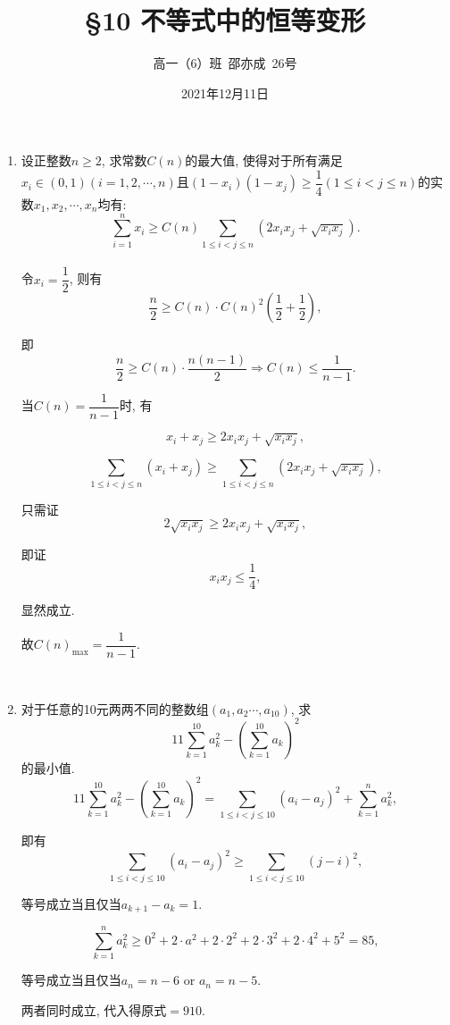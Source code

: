 \documentclass[8pt]{article}
\title{\S 10 不等式中的恒等变形}
\author{高一（6）班\ 邵亦成\ 26号}
\date{2021年12月11日}
\begin{document}
	\maketitle

	\begin{enumerate}
		\item 设正整数$n \geq 2$, 求常数$C(n)$的最大值, 使得对于所有满足$x_i \in (0, 1) (i = 1, 2, \cdots, n)$且$(1-x_i)(1-x_j) \geq \dfrac{1}{4} (1\leq i<j \leq n)$的实数$x_1, x_2, \cdots, x_n$均有: $$\sum_{i=1}^{n} x_i \geq C(n) \sum_{1\leq i<j\leq n} \left(2 x_i x_j + \sqrt{x_i x_j}\right).$$
			~\\

			令$x_i = \dfrac{1}{2}$, 则有$$\frac{n}{2} \geq C(n) \cdot C(n)^2 \left(\frac{1}{2} + \frac{1}{2}\right),$$

			即$$\frac{n}{2} \geq C(n) \cdot \frac{n(n-1)}{2} \Rightarrow C(n) \leq \frac{1}{n-1}.$$

			当$C(n)=\dfrac{1}{n-1}$时, 有

			$$x_i + x_j \geq 2 x_i x_j + \sqrt{x_i x_j},$$

			$$\sum_{1\leq i<j\leq n}(x_i + x_j) \geq \sum_{1\leq i<j\leq n} \left(2x_i x_j + \sqrt{x_i x_j}\right),$$

			只需证$$2\sqrt{x_i x_j} \geq 2x_i x_j + \sqrt{x_i x_j},$$

			即证$$x_i x_j \leq \frac{1}{4},$$

			显然成立.

			故$C(n)_{\max}=\dfrac{1}{n-1}$.

		~\\

		\item 对于任意的10元两两不同的整数组$(a_1, a_2 \cdots, a_{10})$, 求$$11\sum_{k=1}^{10} a_k^2 - \left(\sum_{k=1}^{10} a_k\right)^2$$的最小值.
			~\\

			$$11\sum_{k=1}^{10} a_k^2 - \left(\sum_{k=1}^{10} a_k\right)^2 = \sum_{1\leq i<j\leq 10} (a_i - a_j)^2 + \sum_{k=1}^{n} a_k^2,$$

			即有$$\sum_{1\leq i<j\leq 10} (a_i - a_j)^2 \geq \sum_{1\leq i<j\leq 10} (j-i)^2, $$

			等号成立当且仅当$a_{k+1}-a_k=1$.

			$$\sum_{k=1}^{n} a_k^2 \geq 0^2 + 2\cdot a^2 + 2\cdot 2^2 + 2\cdot 3^2 + 2\cdot 4^2 + 5^2 = 85,$$

			等号成立当且仅当$a_n = n-6$ or $a_n = n-5$.

			两者同时成立, 代入得原式$=910$.


\end{enumerate}
\end{document}
